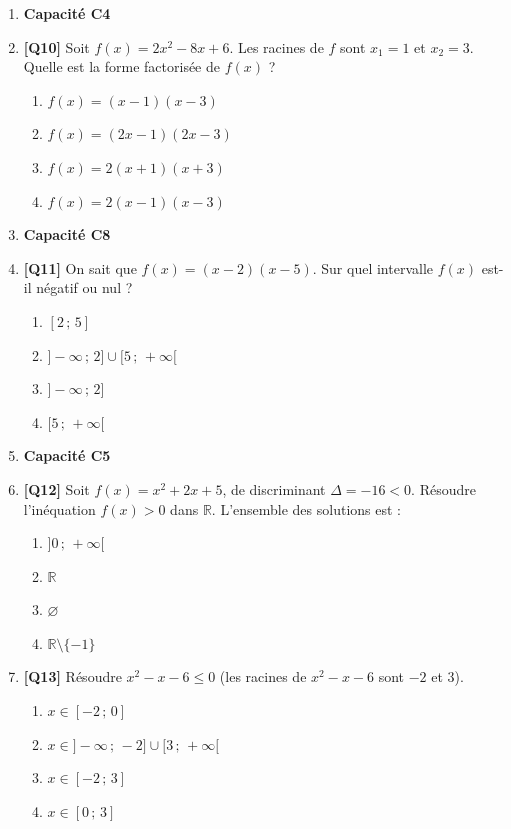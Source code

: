 \begin{enumerate}
\item[] \textbf{Capacité C4}

\item \textbf{[Q10]} Soit $f(x) = 2x^2 - 8x + 6$. Les racines de $f$ sont $x_1 = 1$ et $x_2 = 3$. Quelle est la forme factorisée de $f(x)$ ?
  \begin{enumerate}[label=\Alph*.]
    \item $f(x) = (x - 1)(x - 3)$
    \item $f(x) = (2x - 1)(2x - 3)$
    \item $f(x) = 2(x + 1)(x + 3)$
    \item $f(x) = 2(x - 1)(x - 3)$
  \end{enumerate}

\item[] \textbf{Capacité C8}

\item \textbf{[Q11]} On sait que $f(x) = (x-2)(x-5)$. Sur quel intervalle $f(x)$ est-il négatif ou nul ?
  \begin{enumerate}[label=\Alph*.]
    \item $[2\,;\,5]$
    \item $]-\infty\,;\,2] \cup [5\,;\,+\infty[$
    \item $]-\infty\,;\,2]$
    \item $[5\,;\,+\infty[$
  \end{enumerate}

\item[] \textbf{Capacité C5}

\item \textbf{[Q12]} Soit $f(x)=x^2+2x+5$, de discriminant $\Delta=-16<0$. Résoudre l’inéquation $f(x)>0$ dans $\mathbb{R}$. L’ensemble des solutions est :
  \begin{enumerate}[label=\Alph*.]
    \item $]0\,;\,+\infty[$
    \item $\mathbb{R}$
    \item $\varnothing$
    \item $\mathbb{R}\setminus\{-1\}$
  \end{enumerate}

\item \textbf{[Q13]} Résoudre $x^2 - x - 6 \leq 0$ (les racines de $x^2 - x - 6$ sont $-2$ et $3$).
  \begin{enumerate}[label=\Alph*.]
    \item $x \in [-2\,;\,0]$
    \item $x \in ]-\infty\,;\,-2] \cup [3\,;\,+\infty[$
    \item $x \in [-2\,;\,3]$
    \item $x \in [0\,;\,3]$
  \end{enumerate}


\end{enumerate}
